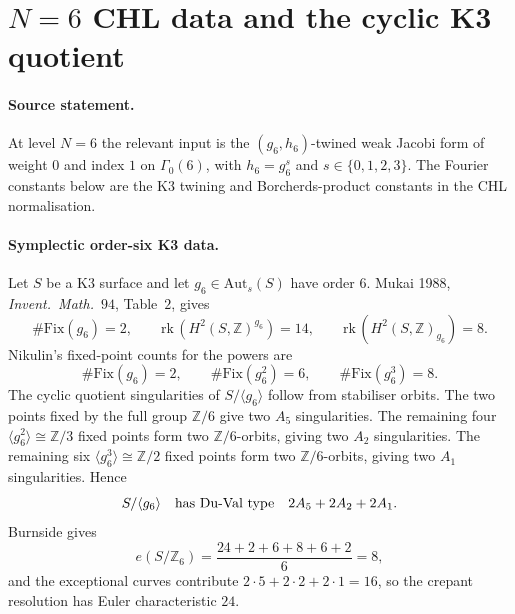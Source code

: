 
\providecommand{\kBKM}{\kappa_{\mathrm{BKM}}}
\providecommand{\kch}{\kappa_{\mathrm{ch}}}
\providecommand{\kcat}{\kappa_{\mathrm{cat}}}
\providecommand{\kfib}{\kappa_{\mathrm{fiber}}}
\providecommand{\K}{\mathrm{K3}}
\providecommand{\Fix}{\mathrm{Fix}}
\providecommand{\Z}{\mathbb{Z}}
\providecommand{\Q}{\mathbb{Q}}
\providecommand{\C}{\mathbb{C}}

\section*{$N = 6$ CHL data and the cyclic K3 quotient}

\paragraph{Source statement.}
At level $N = 6$ the relevant input is the $(g_6,h_6)$-twined weak
Jacobi form of weight $0$ and index $1$ on $\Gamma_0(6)$, with
$h_6=g_6^s$ and $s \in \{0,1,2,3\}$. The Fourier constants below are
the K3 twining and Borcherds-product constants in the CHL
normalisation.

\paragraph{Symplectic order-six K3 data.}
Let $S$ be a K3 surface and let
$g_6 \in \mathrm{Aut}_s(S)$ have order $6$. Mukai 1988,
\emph{Invent.\ Math.}~$94$, Table~$2$, gives
\[
  \#\Fix(g_6)=2,\qquad
  \mathrm{rk}\,(H^2(S,\Z)^{g_6})=14,\qquad
  \mathrm{rk}\,(H^2(S,\Z)_{g_6})=8 .
\]
Nikulin's fixed-point counts for the powers are
\[
  \#\Fix(g_6)=2,\qquad
  \#\Fix(g_6^2)=6,\qquad
  \#\Fix(g_6^3)=8 .
\]
The cyclic quotient singularities of $S/\langle g_6\rangle$ follow from
stabiliser orbits. The two points fixed by the full group
$\Z/6$ give two $A_5$ singularities. The remaining four
$\langle g_6^2\rangle \cong \Z/3$ fixed points form two
$\Z/6$-orbits, giving two $A_2$ singularities. The remaining six
$\langle g_6^3\rangle \cong \Z/2$ fixed points form two
$\Z/6$-orbits, giving two $A_1$ singularities. Hence
\[
  S/\langle g_6\rangle
  \quad\hbox{has Du-Val type}\quad
  2A_5+2A_2+2A_1 .
\]
Burnside gives
\[
  e(S/\Z_6)=\frac{24+2+6+8+6+2}{6}=8,
\]
and the exceptional curves contribute
$2\cdot5+2\cdot2+2\cdot1=16$, so the crepant resolution has Euler
characteristic $24$.

